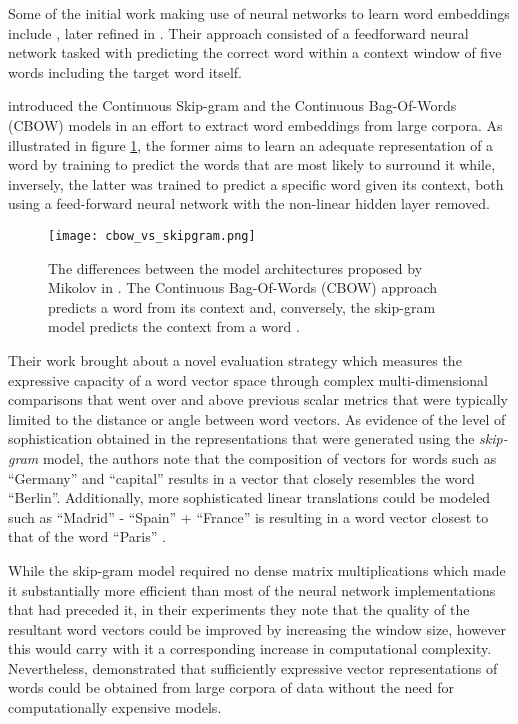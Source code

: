 \documentclass[../../fyp.tex]{subfiles}
\begin{document}
Some of the initial work making use of neural networks to learn word embeddings include \cite{collobert2008}, later refined in \citet{collobert2011}. Their approach consisted of a feedforward neural network tasked with predicting the correct word within a context window of five words including the target word itself.

\citet{mikolov2013} introduced the Continuous Skip-gram and the Continuous Bag-Of-Words (CBOW) models in an effort to extract word embeddings from large corpora. As illustrated in figure \ref{fig:cbow_vs_skipgram}, the former aims to learn an adequate representation of a word by training to predict the words that are most likely to surround it while, inversely, the latter was trained to predict a specific word given its context, both using a feed-forward neural network with the non-linear hidden layer removed.

\begin{figure}[!ht]
	\centering
	\texttt{[image: cbow\_vs\_skipgram.png]}
	\caption{The differences between the model architectures proposed by Mikolov in \cite{mikolov2013}. The Continuous Bag-Of-Words (CBOW) approach predicts a word from its context and, conversely, the skip-gram model predicts the context from a word \cite{mikolov2013b}.}
	\label{fig:cbow_vs_skipgram}
\end{figure}

Their work brought about a novel evaluation strategy which measures the expressive capacity of a word vector space through complex multi-dimensional comparisons that went over and above previous scalar metrics that were typically limited to the distance or angle between word vectors. As evidence of the level of sophistication obtained in the representations that were generated using the \textit{skip-gram} model, the authors note that the composition of vectors for words such as \enquote{Germany} and \enquote{capital} results in a vector that closely resembles the word \enquote{Berlin}. Additionally, more sophisticated linear translations could be modeled such as \enquote{Madrid} - \enquote{Spain} + \enquote{France} is resulting in a word vector closest to that of the word \enquote{Paris} \cite{mikolov2013c}.

While the skip-gram model required no dense matrix multiplications which made it substantially more efficient than most of the neural network implementations that had preceded it, in their experiments they note that the quality of the resultant word vectors could be improved by increasing the window size, however this would carry with it a corresponding increase in computational complexity. Nevertheless, \citet{mikolov2013} demonstrated that sufficiently expressive vector representations of words could be obtained from large corpora of data without the need for computationally expensive models.
\end{document}
